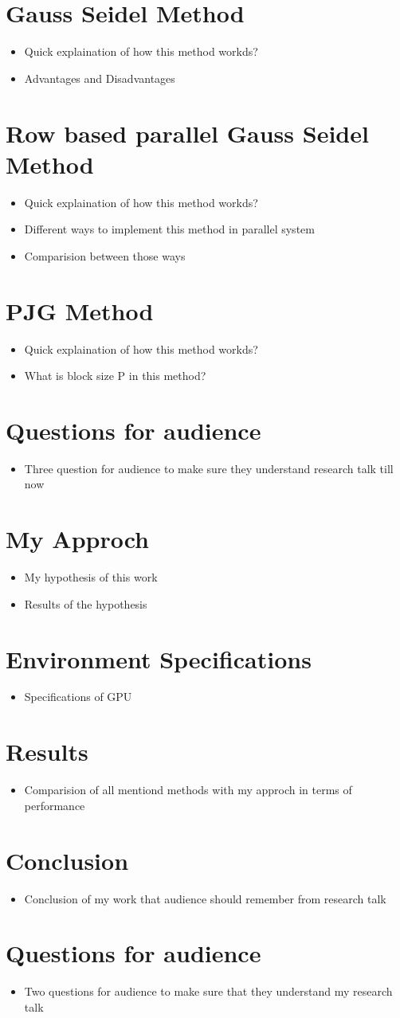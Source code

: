 \documentclass[11pt]{article}       %
\newenvironment{slide}[1]        {\section{#1} \begin{itemize}}%
                                 {\end{itemize}}
\begin{document}
\begin{slide}{Gauss Seidel Method}
\item Quick explaination of how this method workds?
\item Advantages and Disadvantages
\end{slide}

\begin{slide}{Row based parallel Gauss Seidel Method}
\item Quick explaination of how this method workds?
\item Different ways to implement this method in parallel system
\item Comparision between those ways
\end{slide}

\begin{slide}{PJG Method}
\item Quick explaination of how this method workds?
\item What is block size P in this method?
\end{slide}

\begin{slide}{Questions for audience}
\item Three question for audience to make sure they understand research talk till now
\end{slide}

\begin{slide}{My Approch}
\item My hypothesis of this work
\item Results of the hypothesis
\end{slide}

\begin{slide}{Environment Specifications}
\item Specifications of GPU
\end{slide}

\begin{slide}{Results}
\item Comparision of all mentiond methods with my approch in terms of performance
\end{slide}

\begin{slide}{Conclusion}
\item Conclusion of my work that audience should remember from research talk
\end{slide}

\begin{slide}{Questions for audience}
\item Two questions for audience to make sure that they understand my research talk
\end{slide}

\end{document}
